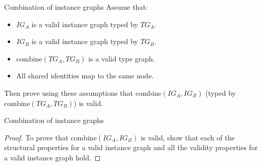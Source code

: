 \begin{frame}{Combination of instance graphs}
Assume that:
\begin{itemize}
    \item $IG_A$ is a valid instance graph typed by $TG_A$.
    \item $IG_B$ is a valid instance graph typed by $TG_B$.
    \item $\mathrm{combine}(TG_A, TG_B)$ is a valid type graph.
    \item All shared identities map to the same node.
\end{itemize}

Then prove using these assumptions that $\mathrm{combine}(IG_A, IG_B)$ (typed by $\mathrm{combine}(TG_A, TG_B)$) is valid.
\end{frame}


\begin{frame}{Combination of instance graphs}
\begin{proof}
To prove that $\mathrm{combine}(IG_A, IG_B)$ is valid, show that each of the structural properties for a valid instance graph and all the validity properties for a valid instance graph hold.
\end{proof}
\end{frame}


